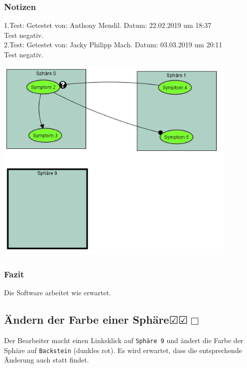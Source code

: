 \documentclass[enabledeprecatedfontcommands]{scrartcl}
\newcommand{\subsectiont}[2]{\subsection[#1]{#1{\normalsize\normalfont #2}}}
\newcommand{\leer}{$\Box$}
\newcommand{\ok}{$\CheckedBox$}
\begin{document}
\subsubsection{Notizen}
1.Test: Getestet von: Anthony Mendil. Datum: 22.02.2019 um 18:37 \\
Test negativ.\\
2.Test: Getestet von: Jacky Philipp Mach. Datum: 03.03.2019 um 20:11 \\
Test negativ. 
\begin{center}
\includegraphics[height=10cm]{2_13.PNG}
\end{center}
\subsubsection{Fazit}
Die Software arbeitet wie erwartet.

\subsectiont{Ändern der Farbe einer Sphäre}{\dotfill\ok\ok\leer}
Der Bearbeiter macht einen Linksklick auf \texttt{Sphäre 9} und ändert die Farbe der Sphäre auf \texttt{Backstein} (dunkles rot). Es wird erwartet, dass die entsprechende Änderung auch statt findet. 
\end{document}
